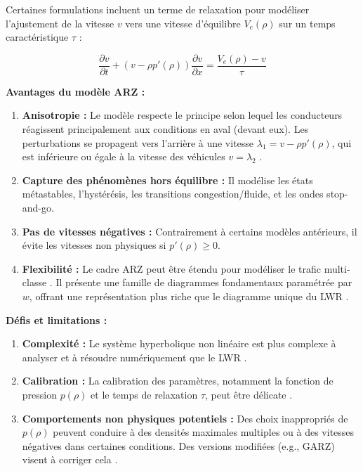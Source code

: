 Certaines formulations incluent un terme de relaxation pour modéliser l'ajustement de la vitesse $v$ vers une vitesse d'équilibre $V_e(\rho)$ sur un temps caractéristique $\tau$ \cite{yu2024traffic}:

\begin{equation}
\frac{\partial v}{\partial t} + (v - \rho p'(\rho)) \frac{\partial v}{\partial x} = \frac{V_e(\rho) - v}{\tau}
\end{equation}

\textbf{Avantages du modèle ARZ :}

\begin{enumerate}
    \item \textbf{Anisotropie :} Le modèle respecte le principe selon lequel les conducteurs réagissent principalement aux conditions en aval (devant eux). Les perturbations se propagent vers l'arrière à une vitesse $\lambda_1 = v - \rho p'(\rho)$, qui est inférieure ou égale à la vitesse des véhicules $v = \lambda_2$ \cite{yu2024traffic}.
    \item \textbf{Capture des phénomènes hors équilibre :} Il modélise les états métastables, l'hystérésis, les transitions congestion/fluide, et les ondes stop-and-go.
    \item \textbf{Pas de vitesses négatives :} Contrairement à certains modèles antérieurs, il évite les vitesses non physiques si $p'(\rho) \ge 0$.
    \item \textbf{Flexibilité :} Le cadre ARZ peut être étendu pour modéliser le trafic multi-classe \cite{LingChanutLebacque2011Multiclass}. Il présente une famille de diagrammes fondamentaux paramétrée par $w$, offrant une représentation plus riche que le diagramme unique du LWR \cite{FanHertySeibold2014}.
\end{enumerate}

\textbf{Défis et limitations :}

\begin{enumerate}
    \item \textbf{Complexité :} Le système hyperbolique non linéaire est plus complexe à analyser et à résoudre numériquement que le LWR \cite{DiEtAl2024}.
    \item \textbf{Calibration :} La calibration des paramètres, notamment la fonction de pression $p(\rho)$ et le temps de relaxation $\tau$, peut être délicate \cite{KhelifiEtAl2023}.
    \item \textbf{Comportements non physiques potentiels :} Des choix inappropriés de $p(\rho)$ peuvent conduire à des densités maximales multiples ou à des vitesses négatives dans certaines conditions. Des versions modifiées (e.g., GARZ) visent à corriger cela \cite{FanHertySeibold2014}.
\end{enumerate}


